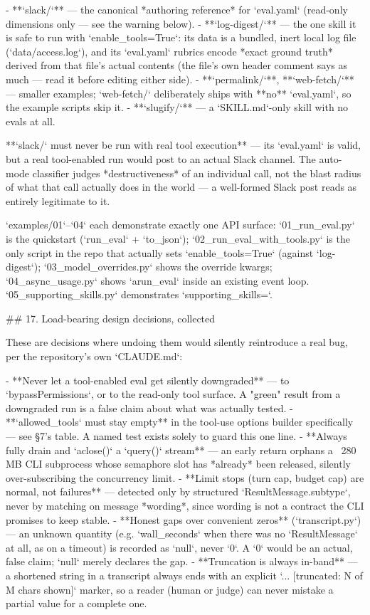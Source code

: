 - **`slack/`** — the canonical *authoring reference* for `eval.yaml` (read-only dimensions only — see the warning below).
- **`log-digest/`** — the one skill it is safe to run with `enable_tools=True`: its data is a bundled, inert local log file (`data/access.log`), and its `eval.yaml` rubrics encode *exact ground truth* derived from that file's actual contents (the file's own header comment says as much — read it before editing either side).
- **`permalink/`**, **`web-fetch/`** — smaller examples; `web-fetch/` deliberately ships with **no** `eval.yaml`, so the example scripts skip it.
- **`slugify/`** — a `SKILL.md`-only skill with no evals at all.

**`slack/` must never be run with real tool execution** — its `eval.yaml` is valid, but a real tool-enabled run would post to an actual Slack channel. The auto-mode classifier judges *destructiveness* of an individual call, not the blast radius of what that call actually does in the world — a well-formed Slack post reads as entirely legitimate to it.

`examples/01`–`04` each demonstrate exactly one API surface: `01_run_eval.py` is the quickstart (`run_eval` + `to_json`); `02_run_eval_with_tools.py` is the only script in the repo that actually sets `enable_tools=True` (against `log-digest`); `03_model_overrides.py` shows the override kwargs; `04_async_usage.py` shows `arun_eval` inside an existing event loop. `05_supporting_skills.py` demonstrates `supporting_skills=`.

## 17. Load-bearing design decisions, collected

These are decisions where undoing them would silently reintroduce a real bug, per the repository's own `CLAUDE.md`:

- **Never let a tool-enabled eval get silently downgraded** — to `bypassPermissions`, or to the read-only tool surface. A "green" result from a downgraded run is a false claim about what was actually tested.
- **`allowed_tools` must stay empty** in the tool-use options builder specifically — see §7's table. A named test exists solely to guard this one line.
- **Always fully drain and `aclose()` a `query()` stream** — an early return orphans a ~280 MB CLI subprocess whose semaphore slot has *already* been released, silently over-subscribing the concurrency limit.
- **Limit stops (turn cap, budget cap) are normal, not failures** — detected only by structured `ResultMessage.subtype`, never by matching on message *wording*, since wording is not a contract the CLI promises to keep stable.
- **Honest gaps over convenient zeros** (`transcript.py`) — an unknown quantity (e.g. `wall_seconds` when there was no `ResultMessage` at all, as on a timeout) is recorded as `null`, never `0`. A `0` would be an actual, false claim; `null` merely declares the gap.
- **Truncation is always in-band** — a shortened string in a transcript always ends with an explicit `... [truncated: N of M chars shown]` marker, so a reader (human or judge) can never mistake a partial value for a complete one.

